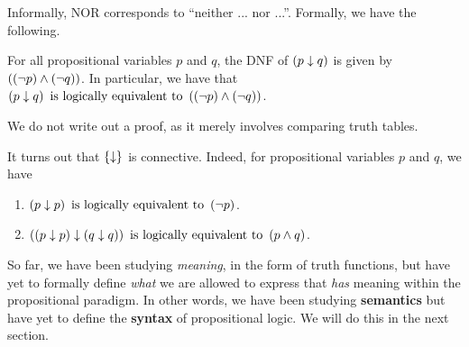 Informally, NOR corresponds to ``neither ... nor ...''. Formally, we have the following.

\begin{boxlemma}
    For all propositional variables $p$ and $q$, the DNF of $\left( p \downarrow q \right)$ is given by $\left( \left( \neg p \right) \land \left( \neg q \right) \right)$. In particular, we have that $\left( p \downarrow q \right) \text{ is logically equivalent to } \left( \left( \neg p \right) \land \left( \neg q \right) \right)$.
\end{boxlemma}
We do not write out a proof, as it merely involves comparing truth tables.

\begin{boxexample}
    It turns out that $\left\{ \downarrow \right\}$ is connective. Indeed, for propositional variables $p$ and $q$, we have
    \begin{enumerate}
        \item $\left( p \downarrow p \right) \text{ is logically equivalent to } \left( \neg p \right)$.
        \item $\left( \left( p \downarrow p \right) \downarrow \left( q \downarrow q \right) \right) \text{ is logically equivalent to } \left( p \land q \right)$.
    \end{enumerate}
\end{boxexample}

So far, we have been studying \textit{meaning}, in the form of truth functions, but have yet to formally define \textit{what} we are allowed to express that \textit{has} meaning within the propositional paradigm. In other words, we have been studying \textbf{semantics} but have yet to define the \textbf{syntax} of propositional logic. We will do this in the next section.
